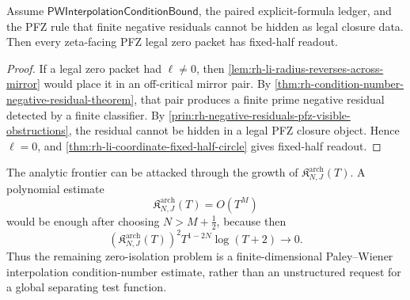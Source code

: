 \begin{corollary}
\label{cor:rh-condition-number-pfz-fixed-half-readout}
Assume $\mathsf{PWInterpolationConditionBound}$, the paired
explicit-formula ledger, and the PFZ rule that finite negative residuals
cannot be hidden as legal closure data.  Then every zeta-facing PFZ
legal zero packet has fixed-half readout.
\end{corollary}

\begin{proof}
If a legal zero packet had $\ell\ne0$, then
\autoref{lem:rh-li-radius-reverses-across-mirror} would place it in an
off-critical mirror pair.  By
\autoref{thm:rh-condition-number-negative-residual-theorem}, that pair
produces a finite prime negative residual detected by a finite
classifier.  By
\autoref{prin:rh-negative-residuals-pfz-visible-obstructions}, the
residual cannot be hidden in a legal PFZ closure object.  Hence
$\ell=0$, and \autoref{thm:rh-li-coordinate-fixed-half-circle} gives
fixed-half readout.
\end{proof}

\begin{principle}
\label{prin:rh-polynomial-condition-number-target}
The analytic frontier can be attacked through the growth of
$\mathfrak K^{\mathrm{arch}}_{N,J}(T)$.  A polynomial estimate
$$
\mathfrak K^{\mathrm{arch}}_{N,J}(T)=O(T^M)
$$
would be enough after choosing $N>M+\frac12$, because then
$$
\left(\mathfrak K^{\mathrm{arch}}_{N,J}(T)\right)^2
T^{1-2N}\log(T+2)\to0.
$$
Thus the remaining zero-isolation problem is a finite-dimensional
Paley--Wiener interpolation condition-number estimate, rather than an
unstructured request for a global separating test function.
\end{principle}
